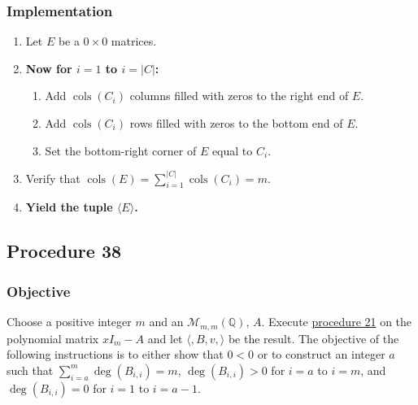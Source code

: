 \documentclass[twocolumn]{article}
\DeclareMathOperator{\cols}{cols}
\begin{document}
			\subsubsection{Implementation}
				\begin{enumerate}
					\item Let $E$ be a $0\times 0$ matrices.
					\item \textbf{Now for $i=1$ to $i=\lvert C\rvert$:}
					\begin{enumerate}
						\item Add $\cols(C_i)$ columns filled with zeros to the right end of $E$.
						\item Add $\cols(C_i)$ rows filled with zeros to the bottom end of $E$.
						\item Set the bottom-right corner of $E$ equal to $C_i$.
					\end{enumerate}
					\item Verify that $\cols(E)=\sum_{i=1}^{\lvert C\rvert}\cols(C_i)=m$.
					\item \textbf{Yield the tuple $\langle E\rangle$.}
				\end{enumerate}
		\subsection{Procedure 38}\label{sec:procedure 38}
			\subsubsection{Objective}
				Choose a positive integer $m$ and an $\mathcal{M}_{m,m}(\mathbb{Q})$, $A$. Execute \hyperref[sec:procedure 21]{procedure 21} on the polynomial matrix $xI_m-A$ and let $\langle ,B,v,\rangle$ be the result. The objective of the following instructions is to either show that $0<0$ or to construct an integer $a$ such that $\sum_{i=a}^m\deg(B_{i,i})=m$, $\deg(B_{i,i})>0$ for $i=a$ to $i=m$, and $\deg(B_{i,i})=0$ for $i=1$ to $i=a-1$.
\end{document}
